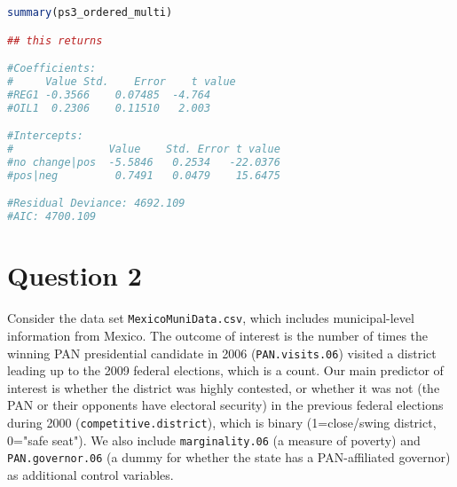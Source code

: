 \documentclass[12pt,letterpaper]{article}
\begin{document}
\begin{enumerate}
\begin{lstlisting}[language=R]
summary(ps3_ordered_multi)

## this returns 

#Coefficients:
#     Value Std.    Error    t value
#REG1 -0.3566    0.07485  -4.764
#OIL1  0.2306    0.11510   2.003

#Intercepts:
#               Value    Std. Error t value 
#no change|pos  -5.5846   0.2534   -22.0376
#pos|neg         0.7491   0.0479    15.6475

#Residual Deviance: 4692.109 
#AIC: 4700.109 


\end{lstlisting}

	
	
	
	
\end{enumerate}

\section*{Question 2} 
\vspace{.25cm}

\noindent Consider the data set \texttt{MexicoMuniData.csv}, which includes municipal-level information from Mexico. The outcome of interest is the number of times the winning PAN presidential candidate in 2006 (\texttt{PAN.visits.06}) visited a district leading up to the 2009 federal elections, which is a count. Our main predictor of interest is whether the district was highly contested, or whether it was not (the PAN or their opponents have electoral security) in the previous federal elections during 2000 (\texttt{competitive.district}), which is binary (1=close/swing district, 0="safe seat"). We also include \texttt{marginality.06} (a measure of poverty) and \texttt{PAN.governor.06} (a dummy for whether the state has a PAN-affiliated governor) as additional control variables. 
\end{document}
